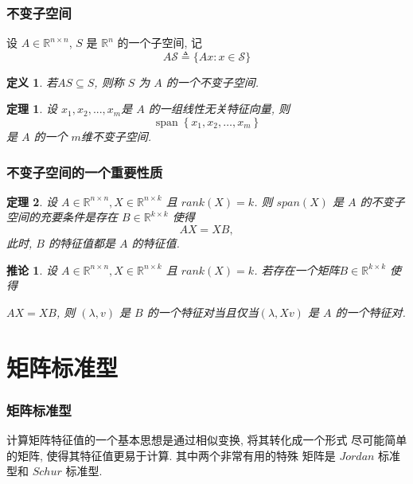 \documentclass[notheorems,serif]{beamer}
\newcommand{\hei}[1]{{\HEI#1}}
\newtheorem{theorem}{\hei{定理}}
\newtheorem{definition}{\hei{定义}}
\newtheorem{corollary}{\hei{推论}}
\begin{document}
\begin{frame}
\frametitle{不变子空间}

设 $A \in \mathbb{R}^{n×n}$, $S$ 是 $\mathbb{R}^n$ 的一个子空间, 记
$$
A \mathcal{S} \triangleq\{A x : x \in \mathcal{S}\}
$$

\begin{definition}
	若$ AS ⊆ S$, 则称 $S$ 为 $A$ 的一个不变子空间.	
\end{definition}



\begin{theorem}
	设 $x_1, x_2, . . . , x_m $是 $A$ 的一组线性无关特征向量, 则
	$$
	\operatorname{span}\left\{x_{1}, x_{2}, \ldots, x_{m}\right\}
	$$
	是 $A$ 的一个 $m $维不变子空间.
\end{theorem}
\end{frame}

\begin{frame}
\frametitle{不变子空间的一个重要性质}
\begin{theorem}
	设 $A \in \mathbb{R}^{n \times n}, X \in \mathbb{R}^{n \times k}$ 且 $rank(X) = k$. 则 $span(X)$ 是 $A$ 的不变子空间的充要条件是存在 $B \in \mathbb{R}^{k \times k}$ 使得
	$$AX = XB,$$
	此时, $B$ 的特征值都是 $A$ 的特征值. 
\end{theorem}



\begin{corollary}
	设 $A \in \mathbb{R}^{n \times n}, X \in \mathbb{R}^{n\times k}$ 且 $rank(X) = k$. 若存在一个矩阵$B \in \mathbb{R}^{k\times k}$ 使得 
	
	$AX = XB$, 则 $(λ, v)$ 是 $B$ 的一个特征对当且仅当$(\lambda, Xv)$ 是 $A$ 的一个特征对.
\end{corollary}
\end{frame}

\section{矩阵标准型}
\begin{frame}
\frametitle{矩阵标准型}
计算矩阵特征值的一个基本思想是通过相似变换, 将其转化成一个形式
尽可能简单的矩阵, 使得其特征值更易于计算. 其中两个非常有用的特殊
矩阵是 $Jordan$ 标准型和 $Schur$ 标准型.
\end{frame}
\end{document}
